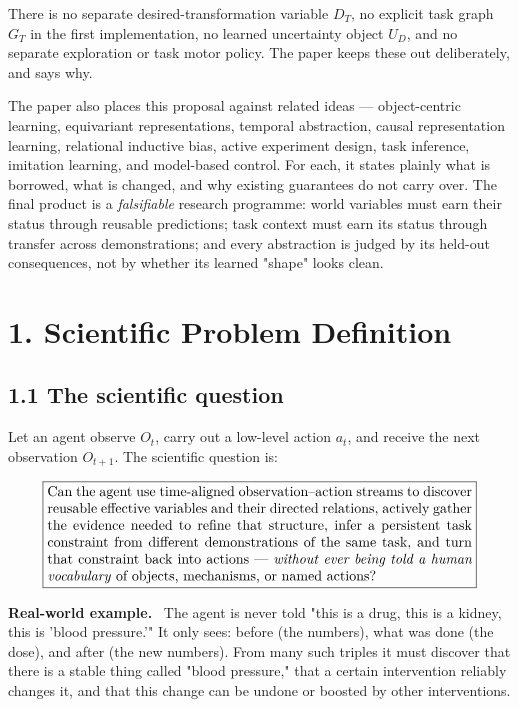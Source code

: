 \documentclass[11pt]{article}
\newenvironment{example}{%
  \par\smallskip\noindent\begin{minipage}{\textwidth}%
  \color{teal!60!black}\small
  \textbf{\color{teal!70!black}Real-world example.}\
}{%
  \end{minipage}\par\smallskip}
\begin{document}
There is no separate desired-transformation variable $D_T$, no explicit task graph $G_T$ in the first implementation, no learned
uncertainty object $U_D$, and no separate exploration or task motor policy. The paper keeps these out deliberately, and says why.

The paper also places this proposal against related ideas --- object-centric learning, equivariant representations, temporal
abstraction, causal representation learning, relational inductive bias, active experiment design, task inference, imitation
learning, and model-based control. For each, it states plainly what is borrowed, what is changed, and why existing guarantees do
not carry over. The final product is a \emph{falsifiable} research programme: world variables must earn their status through
reusable predictions; task context must earn its status through transfer across demonstrations; and every abstraction is judged
by its held-out consequences, not by whether its learned "shape" looks clean.

\section*{1. Scientific Problem Definition}

\subsection*{1.1 The scientific question}

Let an agent observe $O_t$, carry out a low-level action $a_t$, and receive the next observation $O_{t+1}$. The scientific question is:

\[
\boxed{
\begin{minipage}{0.88\textwidth}
Can the agent use time-aligned observation--action streams to discover reusable effective variables and their directed
relations, actively gather the evidence needed to refine that structure, infer a persistent task constraint from different
demonstrations of the same task, and turn that constraint back into actions --- \emph{without ever being told a human
vocabulary} of objects, mechanisms, or named actions?
\end{minipage}}
\]

\begin{example}
The agent is never told "this is a drug, this is a kidney, this is 'blood pressure.'" It only sees: before (the numbers),
what was done (the dose), and after (the new numbers). From many such triples it must discover that there is a stable thing
called "blood pressure," that a certain intervention reliably changes it, and that this change can be undone or boosted by
other interventions.
\end{example}
\end{document}
